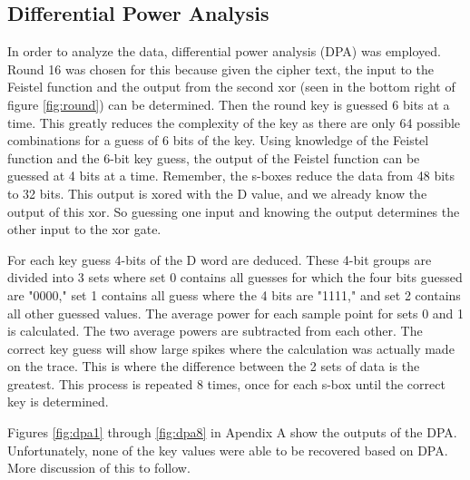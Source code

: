 \subsection{Differential Power Analysis}
	In order to analyze the data, differential power analysis (DPA) was employed.  Round 16 was chosen for this because given the cipher text, the input to the Feistel function and the output from the second xor (seen in the bottom right of figure \ref{fig:round}) can be determined.  Then the round key is guessed 6 bits at a time.  This greatly reduces the complexity of the key as there are only 64 possible combinations for a guess of 6 bits of the key.  Using knowledge of the Feistel function and the 6-bit key guess, the output of the Feistel function can be guessed at 4 bits at a time.  Remember, the s-boxes reduce the data from 48 bits to 32 bits.  This output is xored with the D value, and we already know the output of this xor.  So guessing one input and knowing the output determines the other input to the xor gate.  

	For each key guess 4-bits of the D word are deduced.  These 4-bit groups are divided into 3 sets where set 0 contains all guesses for which the four bits guessed are "0000," set 1 contains all guess where the 4 bits are "1111," and set 2 contains all other guessed values.  The average power for each sample point for sets 0 and 1 is calculated.  The two average powers are subtracted from each other.  The correct key guess will show large spikes where the calculation was actually made on the trace.  This is where the difference between the 2 sets of data is the greatest.  This process is repeated 8 times, once for each s-box until the correct key is determined.

 	 Figures \ref{fig:dpa1} through \ref{fig:dpa8} in Apendix A show the outputs of the DPA.  Unfortunately, none of the key values were able to be recovered based on DPA.  More discussion of this to follow.

